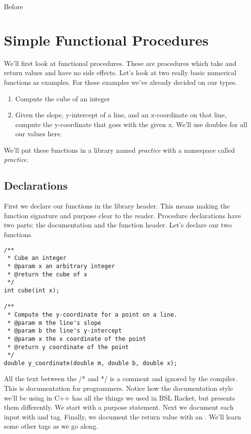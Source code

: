 \documentclass[]{tufte-handout}
\begin{document}
Before 

\section{Simple Functional Procedures}

We'll first look at functional procedures. These are procedures which take and return values and have no side effects.  Let's look at two really basic numerical functions as examples. For these examples we've already decided on our types. 
\begin{enumerate}
\item Compute the cube of an integer
\item Given the slope, y-intercept of a line, and an x-coordinate on that line, compute the y-coordinate that goes with the given x. We'll use doubles for all our values here.
\end{enumerate}
We'll put these functions in a library named \textit{practice} with a namespace called \textit{practice}.


\subsection{Declarations}

First we declare our functions in the library header. This means making the function signature and purpose clear to the reader.  Procedure declarations have two parts: the documentation and the function header.  Let's declare our two functions. 
\begin{verbatim}
/**
 * Cube an integer
 * @param x an arbitrary integer
 * @return the cube of x
 */
int cube(int x);

/**
 * Compute the y-coordinate for a point on a line.
 * @param m the line's slope
 * @param b the line's y-intercept
 * @param x the x coordinate of the point
 * @return y coordinate of the point 
 */
double y_coordinate(double m, double b, double x);

\end{verbatim}
All the text between the /* and */ is a comment and ignored by the compiler.  This is documentation for programmers. Notice how the documentation style we'll be using in C++ has all the things we used in BSL Racket, but presents them differently. We start with a purpose statement. Next we document each input with and \@param tag. Finally, we document the return value with an \@return.  We'll learn some other tags as we go along. 
\end{document}
